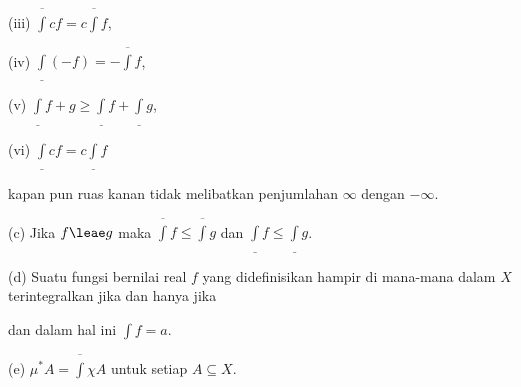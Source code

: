 \vskip2pt

\quad (iii) $\overline{\int}cf=c\overline{\int}f$,

\vskip2pt

\quad (iv) $\underline{\int}(-f)=-\overline{\int}f$,

\vskip2pt

\quad (v) $\underline{\int}f+g\ge\underline{\int}f+\underline{\int}g$,

\vskip2pt

\quad (vi) $\underline{\int}cf=c\underline{\int}f$

\vskip2pt

\noindent kapan pun ruas kanan tidak melibatkan penjumlahan $\infty$ dengan
$-\infty$.

(c) Jika $f\leae g$ maka $\overline{\int}f\le\overline{\int}g$ dan
$\underline{\int}f\le\underline{\int}g$.

(d) Suatu fungsi bernilai real $f$ yang didefinisikan hampir di mana-mana
dalam $X$ terintegralkan jika dan hanya jika


\noindent dan dalam hal ini $\int f=a$.

(e) $\mu^*A=\overline{\int}\chi A$ untuk setiap $A\subseteq X$.

